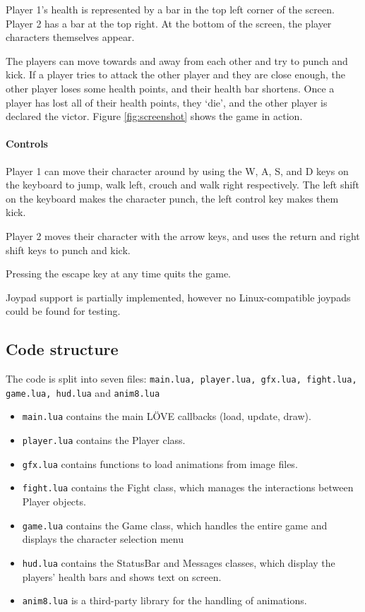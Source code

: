 \documentclass[11pt]{article}
\begin{document}
Player 1's health is represented by a bar in the top left corner of the screen. Player 2 has a bar at the top right. At the bottom of the screen, the player characters themselves appear. 

The players can move towards and away from each other and try to punch and kick. If a player tries to attack the other player and they are close enough, the other player loses some health points, and their health bar shortens. Once a player has lost all of their health points, they `die', and the other player is declared the victor. Figure \ref{fig:screenshot} shows the game in action.

\paragraph{Controls}
Player 1 can move their character around by using the W, A, S, and D keys on the keyboard to jump, walk left, crouch and walk right respectively. The left shift on the keyboard makes the character punch, the left control key makes them kick.

Player 2 moves their character with the arrow keys, and uses the return and right shift keys to punch and kick.

Pressing the escape key at any time quits the game.

Joypad support is partially implemented, however no Linux-compatible joypads could be found for testing.

\subsection{Code structure}
The code is split into seven files: \texttt{main.lua, player.lua, gfx.lua, fight.lua, game.lua, hud.lua} and \texttt{anim8.lua}
\begin{itemize}[noitemsep]
    \item \texttt{main.lua} contains the main L\"{O}VE callbacks (load, update, draw).
    \item \texttt{player.lua} contains the Player class.
    \item \texttt{gfx.lua} contains functions to load animations from image files.
    \item \texttt{fight.lua} contains the Fight class, which manages the interactions between Player objects.
    \item \texttt{game.lua} contains the Game class, which handles the entire game and displays the character selection menu
    \item \texttt{hud.lua} contains the StatusBar and Messages classes, which display the players' health bars and shows text on screen.
    \item \texttt{anim8.lua} is a third-party library for the handling of animations.
\end{itemize}
\end{document}
